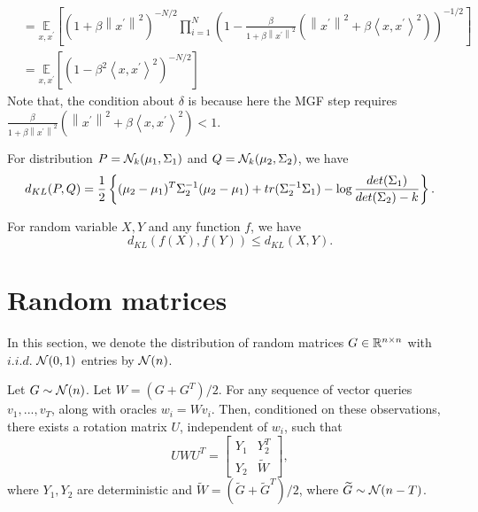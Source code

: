 \documentclass[10pt]{book}
\begin{document}
{$$\begin{aligned}
& =\underset{x, x^{\prime}}{\mathbb{E}}\left[\left(1+\beta\left\|x^{\prime}\right\|^2\right)^{-N / 2} \prod_{i=1}^N\left(1-\frac{\beta}{1+\beta\left\|x^{\prime}\right\|^2}\left(\left\|x^{\prime}\right\|^2+\beta\left\langle x, x^{\prime}\right\rangle^2\right)\right)^{-1 / 2}\right] \\
& =\underset{x, x^{\prime}}{\mathbb{E}}\left[\left(1-\beta^2\left\langle x, x^{\prime}\right\rangle^2\right)^{-N / 2}\right]
\end{aligned}
$$
Note that, the condition about $\delta$ is because here the MGF step requires
$
\frac{\beta}{1+\beta\left\|x^{\prime}\right\|^2}\left(\left\|x^{\prime}\right\|^2+\beta\left\langle x, x^{\prime}\right\rangle^2\right)<1
$.
}

\begin{thm}
\label{gauss_kl}
For distribution $P=\mathcal{N}_k(\mu_1,\Sigma_1)$ and $Q=\mathcal{N}_k(\mu_2,\Sigma_2)$, we have
\[
d_{KL}(P,Q)=\frac{1}{2}\left\{
(\mu_2-\mu_1)^T\Sigma_2^{-1}(\mu_2-\mu_1)
+ tr(\Sigma_2^{-1}\Sigma_1) - \log\frac{det(\Sigma_1)}{det(\Sigma_2)-k}
\right\}.
\]
\end{thm}

\begin{thm}
\label{data_process}
For random variable $X,Y$ and any function $f$, we have
\[
d_{KL}(f(X),f(Y))\le d_{KL}(X,Y).
\]
\end{thm}
\section{Random matrices}
In this section, we denote the distribution of random matrices $G\in\mathbb{R}^{n\times n}$ with $i.i.d.$ $\mathcal{N}(0,1)$ entries by $\mathcal{N}(n)$.
\begin{thm}
\label{block_conditional} 
Let $G\sim\mathcal{N}(n)$. Let $W=(G+G^T)/2$. For any sequence of vector queries $v_1,...,v_T$, along with oracles $w_i=Wv_i$. Then, conditioned on these observations, there exists a rotation matrix $U$, independent of $w_i$, such that
\[
UWU^T=\begin{bmatrix}
    Y_1 & Y_2^T \\
    Y_2 & \widetilde{W}
\end{bmatrix},
\]
where $Y_1,Y_2$ are deterministic and $\widetilde{W}=(\widetilde{G}+\widetilde{G}^T)/2$, where $\widetilde{G}\sim\mathcal{N}(n-T)$.
\end{thm}
\pfsk{\ref{block_conditional}}{

}
\end{document}
